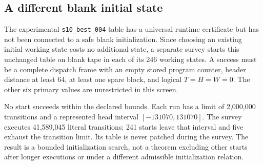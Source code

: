 \subsection{A different blank initial state}

The experimental \texttt{s10\_best\_004} table has a universal runtime
certificate but has not been connected to a safe blank initialization.
Since choosing an existing initial working state costs no additional
state, a separate survey starts this unchanged table on blank tape in
each of its 246 working states. A success must be a complete dispatch
frame with an empty stored program counter, header distance at least 64,
at least one spare block, and logical $T=H=W=0$. The other six primary
values are unrestricted in this screen.

No start succeeds within the declared bounds. Each run has a limit of
2,000,000 transitions and a represented head interval
$[-131070,131070]$. The survey executes 41,589,045 literal transitions;
241 starts leave that interval and five exhaust the transition limit.
Its table is never patched during the survey. The result is a bounded
initialization search, not a theorem excluding other starts after longer
executions or under a different admissible initialization relation.
